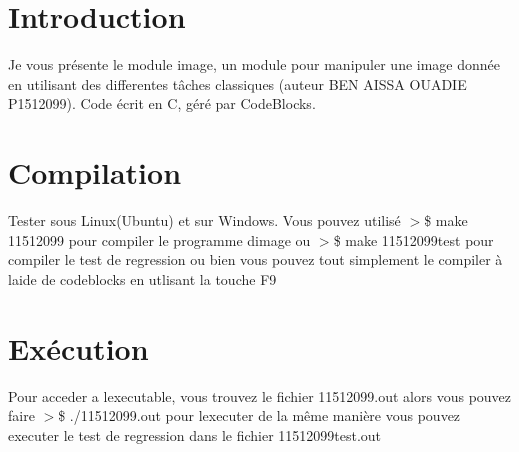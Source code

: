 \hypertarget{index_Introduction}{}\section{Introduction}\label{index_Introduction}
 Je vous présente le module image, un module pour manipuler une image donnée en utilisant des differentes tâches classiques (auteur B\+E\+N A\+I\+S\+S\+A O\+U\+A\+D\+I\+E P1512099). Code écrit en C, géré par Code\+Blocks. \hypertarget{index_Compilation}{}\section{Compilation}\label{index_Compilation}
Tester sous Linux(\+Ubuntu) et sur Windows. Vous pouvez utilisé $>$\$ make 11512099 pour compiler le programme d\textquotesingle{}image ou $>$\$ make 11512099test pour compiler le test de regression ou bien vous pouvez tout simplement le compiler à l\textquotesingle{}aide de codeblocks en utlisant la touche F9 \hypertarget{index_Exécution}{}\section{Exécution}\label{index_Exécution}
Pour acceder a l\textquotesingle{}executable, vous trouvez le fichier 11512099.\+out alors vous pouvez faire $>$\$ ./11512099.out pour l\textquotesingle{}executer de la même manière vous pouvez executer le test de regression dans le fichier 11512099test.\+out  